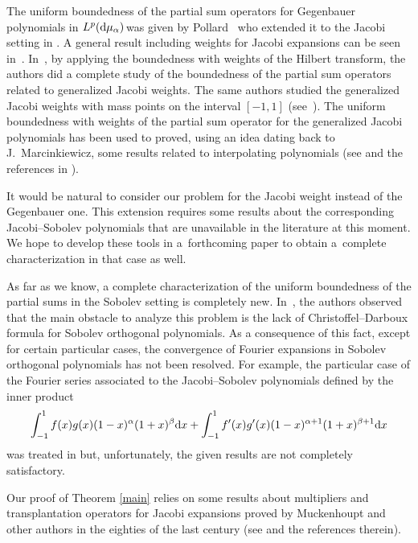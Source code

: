\documentclass[pdftex]{sigma}
\numberwithin{equation}{section}
\begin{document}
The uniform boundedness of the partial sum operators for Gegenbauer polynomials in $L^p({\rm d}\mu_{\alpha})\!$ was given by Pollard~\cite{PollardII} who extended it to the Jacobi setting in \cite{PollardIII}. A general result including weights for Jacobi expansions can be seen in~\cite{muckenhoupt}. In~\cite{GPRV1}, by applying the boundedness with weights of the Hilbert transform, the authors did a complete study of the boundedness of the partial sum operators related to generalized Jacobi weights. The same authors studied the generalized Jacobi weights with mass points on the interval $[-1,1]$ (see~\cite{GPRV2}). The uniform boundedness with weights of the partial sum operator for the generalized Jacobi polynomials has been used to proved, using an idea dating back to J.~Marcinkiewicz, some results related to interpolating polynomials (see \cite{Xu-93,Xu-94} and the references in \cite{Nevai}).

It would be natural to consider our problem for the Jacobi weight instead of the Gegenbauer one. This extension requires some results about the corresponding Jacobi--Sobolev polyno\-mials that are unavailable in the literature at this moment. We hope to develop these tools in a~forthcoming paper to obtain a~complete characterization in that case as well.

As far as we know, a complete characterization of the uniform boundedness of the partial sums in the Sobolev setting is completely new. In~\cite{Marce-Xu}, the authors observed that the main obstacle to analyze this problem is the lack of Christoffel--Darboux formula for Sobolev orthogonal polynomials. As a consequence of this fact, except for certain particular cases, the convergence of Fourier expansions in Sobolev orthogonal polynomials has not been resolved. For example, the particular case of the Fourier series associated to the Jacobi--Sobolev polynomials defined by the inner product
\begin{gather*}
\int_{-1}^{1} f(x)g(x)(1-x)^\alpha(1+x)^\beta {\rm d}x+ \int_{-1}^{1} f'(x)g'(x)(1-x)^{\alpha+1}(1+x)^{\beta+1} {\rm d}x
\end{gather*}
was treated in \cite{MQU} but, unfortunately, the given results are not completely satisfactory.


Our proof of Theorem \ref{main} relies on some results about multipliers and transplantation ope\-ra\-tors for Jacobi expansions proved by Muckenhoupt and other authors in the eighties of the last century (see \cite{muckenhoupt1} and the references therein).
\end{document}
